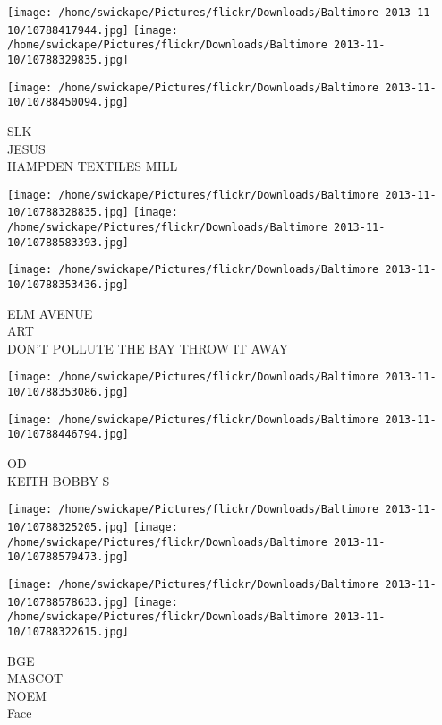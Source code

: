 \documentclass[10pt,letterpaper]{article}
\begin{document}
\texttt{[image: /home/swickape/Pictures/flickr/Downloads/Baltimore 2013-11-10/10788417944.jpg]}
\texttt{[image: /home/swickape/Pictures/flickr/Downloads/Baltimore 2013-11-10/10788329835.jpg]}

\vspace{0.25in}
\texttt{[image: /home/swickape/Pictures/flickr/Downloads/Baltimore 2013-11-10/10788450094.jpg]}

SLK\\
JESUS\\
HAMPDEN TEXTILES MILL\\
\pagebreak

\texttt{[image: /home/swickape/Pictures/flickr/Downloads/Baltimore 2013-11-10/10788328835.jpg]}
\texttt{[image: /home/swickape/Pictures/flickr/Downloads/Baltimore 2013-11-10/10788583393.jpg]}

\vspace{0.25in}
\texttt{[image: /home/swickape/Pictures/flickr/Downloads/Baltimore 2013-11-10/10788353436.jpg]}

ELM AVENUE\\
ART\\
DON'T POLLUTE THE BAY THROW IT AWAY\\
\pagebreak

\texttt{[image: /home/swickape/Pictures/flickr/Downloads/Baltimore 2013-11-10/10788353086.jpg]}

\vspace{0.25in}
\texttt{[image: /home/swickape/Pictures/flickr/Downloads/Baltimore 2013-11-10/10788446794.jpg]}

OD\\
KEITH BOBBY S\\
\pagebreak

\texttt{[image: /home/swickape/Pictures/flickr/Downloads/Baltimore 2013-11-10/10788325205.jpg]}
\texttt{[image: /home/swickape/Pictures/flickr/Downloads/Baltimore 2013-11-10/10788579473.jpg]}

\texttt{[image: /home/swickape/Pictures/flickr/Downloads/Baltimore 2013-11-10/10788578633.jpg]}
\texttt{[image: /home/swickape/Pictures/flickr/Downloads/Baltimore 2013-11-10/10788322615.jpg]}

BGE\\
MASCOT\\
NOEM\\
Face\\
\pagebreak
\end{document}
